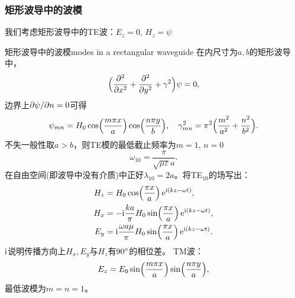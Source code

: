 \subsubsection{矩形波导中的波模}
我们考虑矩形波导中的TE波：$E_z=0,\,H_z=\psi$
\begin{example}{矩形波导中的波模}{modes in a rectangular waveguide}
    在内尺寸为$a,b$的矩形波导中，
    \[
        \Bigkh{\pp[2]x+\pp[2]y+\gamma^2}\psi=0,
    \]
    边界上$\p\psi/\p n=0$可得
    \[
        \psi_{mn}=H_0\cos\Bigkh{\frac{m\pi x}a}\cos\Bigkh{\frac{n\pi y}b},\quad\gamma_{mn}^2=\pi^2\Bigkh{\frac{m^2}{a^2}+\frac{n^2}{b^2}}.
    \]
    不失一般性取$a>b$，则TE模的最低截止频率为$m=1,\,n=0$
    \[
        \omega_{10}=\frac\pi{\sqrt{\mu\varepsilon}a}.
    \]
    在自由空间(即波导中没有介质)中正好$\lambda_{10}=2a$。将TE$_{10}$的场写出：
    \begin{align*}
        H_z&=H_0\cos\Bigkh{\frac{\pi x}a}\e{\i(kz-\omega t)},\\
        H_x&=-\i\frac{ka}\pi H_0\sin\Bigkh{\frac{\pi x}a}\e{\i(kz-\omega t)},\\
        E_y&=\i\frac{\omega a\mu}\pi H_0\sin\Bigkh{\frac{\pi x}a}\e{\i(kz-\omega t)}.
    \end{align*}
    $\i$说明传播方向上$H_x,E_y$与$H_z$有$90\degree$的相位差。
    \tcblower
    TM波：
    \[
        E_z=E_0\sin\Bigkh{\frac{m\pi x}a}\sin\Bigkh{\frac{n\pi y}a},
    \]
    最低波模为$m=n=1$。
\end{example}
